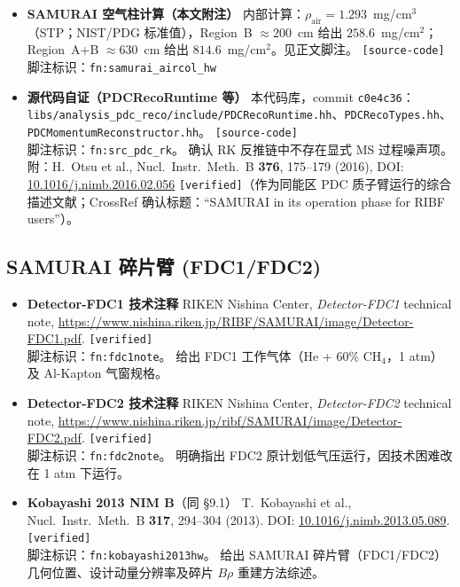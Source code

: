 \documentclass[a4paper, 11pt]{article}
\begin{document}
\begin{itemize}[leftmargin=2em,itemsep=3pt]
\item \textbf{SAMURAI 空气柱计算（本文附注）} \quad
内部计算：$\rho_\text{air} = 1.293$~mg/cm$^3$（STP；NIST/PDG 标准值），Region~B $\approx 200$~cm 给出 $258.6$~mg/cm$^2$；Region~A+B $\approx 630$~cm 给出 $814.6$~mg/cm$^2$。见正文脚注。
\texttt{[source-code]}
\\
脚注标识：\texttt{fn:samurai\_aircol\_hw}

\item \textbf{源代码自证（PDCRecoRuntime 等）} \quad
本代码库，commit \texttt{c0e4c36}：\texttt{libs/analysis\_pdc\_reco/include/PDCRecoRuntime.hh}、\texttt{PDCRecoTypes.hh}、\texttt{PDCMomentumReconstructor.hh}。
\texttt{[source-code]}
\\
脚注标识：\texttt{fn:src\_pdc\_rk}。
确认 RK 反推链中不存在显式 MS 过程噪声项。
附：H.~Otsu et al., Nucl.\ Instr.\ Meth.\ B \textbf{376}, 175--179 (2016),
DOI: \href{https://doi.org/10.1016/j.nimb.2016.02.056}{10.1016/j.nimb.2016.02.056} \texttt{[verified]}（作为同能区 PDC 质子臂运行的综合描述文献；CrossRef 确认标题：``SAMURAI in its operation phase for RIBF users''）。

\end{itemize}

\subsection{SAMURAI 碎片臂 (FDC1/FDC2)}

\begin{itemize}[leftmargin=2em,itemsep=3pt]

\item \textbf{Detector-FDC1 技术注释} \quad
RIKEN Nishina Center, \emph{Detector-FDC1} technical note,
\url{https://www.nishina.riken.jp/RIBF/SAMURAI/image/Detector-FDC1.pdf}.
\texttt{[verified]}
\\
脚注标识：\texttt{fn:fdc1note}。
给出 FDC1 工作气体（He + 60\% CH$_4$，1 atm）及 Al-Kapton 气窗规格。

\item \textbf{Detector-FDC2 技术注释} \quad
RIKEN Nishina Center, \emph{Detector-FDC2} technical note,
\url{https://www.nishina.riken.jp/ribf/SAMURAI/image/Detector-FDC2.pdf}.
\texttt{[verified]}
\\
脚注标识：\texttt{fn:fdc2note}。
明确指出 FDC2 原计划低气压运行，因技术困难改在 1 atm 下运行。

\item \textbf{Kobayashi 2013 NIM B}（同 §9.1）\quad
T.~Kobayashi et al., Nucl.\ Instr.\ Meth.\ B \textbf{317}, 294--304 (2013).
DOI: \href{https://doi.org/10.1016/j.nimb.2013.05.089}{10.1016/j.nimb.2013.05.089}.
\texttt{[verified]}
\\
脚注标识：\texttt{fn:kobayashi2013hw}。
给出 SAMURAI 碎片臂（FDC1/FDC2）几何位置、设计动量分辨率及碎片 $B\rho$ 重建方法综述。

\end{itemize}
\end{document}
